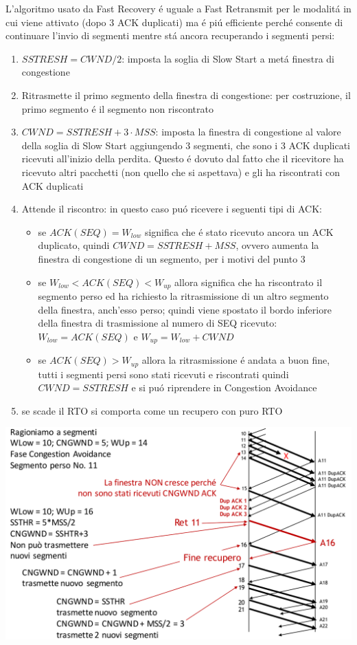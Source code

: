 \documentclass[12pt]{article}
\begin{document}
L'algoritmo usato da Fast Recovery \'e uguale a Fast Retransmit per le modalit\'a in cui viene attivato (dopo 3 ACK 
duplicati) ma \'e pi\'u efficiente perch\'e consente di continuare l'invio di segmenti mentre st\'a ancora 
recuperando i segmenti persi:
\begin{enumerate}[noitemsep]
	\item $SSTRESH = CWND/2$: imposta la soglia di Slow Start a met\'a finestra di congestione
	\item Ritrasmette il primo segmento della finestra di congestione: per costruzione, il primo segmento \'e il 
	      segmento non riscontrato
	\item $CWND = SSTRESH + 3 \cdotp MSS$: imposta la finestra di congestione al valore della soglia di Slow Start
		  aggiungendo 3 segmenti, che sono i 3 ACK duplicati ricevuti all'inizio della perdita. Questo \'e dovuto 
		  dal fatto che il ricevitore ha ricevuto altri pacchetti (non quello che si aspettava) e gli ha 
		  riscontrati con ACK duplicati
	\item Attende il riscontro: in questo caso pu\'o ricevere i seguenti tipi di ACK:
	\begin{itemize}
		\item se $ACK(SEQ) = W_{low}$ significa che \'e stato ricevuto ancora un ACK duplicato, quindi 
		      $CWND = SSTRESH + MSS$, ovvero aumenta la finestra di congestione di un segmento, per i motivi del 
		      punto 3
		\item se $W_{low} < ACK(SEQ) < W_{up}$ allora significa che ha riscontrato il segmento perso ed ha richiesto 
		      la ritrasmissione di un altro segmento della finestra, anch'esso perso; quindi viene spostato il bordo 
	 	      inferiore della finestra di trasmissione al numero di SEQ ricevuto: 
	 	      $W_{low} = ACK(SEQ)$ e $W_{up} = W_{low} + CWND$     
		\item se $ACK(SEQ) > W_{up}$ allora la ritrasmissione \'e andata a buon fine, tutti i segmenti persi sono 
		      stati ricevuti e riscontrati quindi $CWND = SSTRESH$ e si pu\'o riprendere in Congestion Avoidance 
	\end{itemize}		
	\item se scade il RTO si comporta come un recupero con puro RTO
\end{enumerate}

\begin{center}
	\includegraphics[scale=0.35]{livello_trasporto-img16.png}
\end{center}
\end{document}
